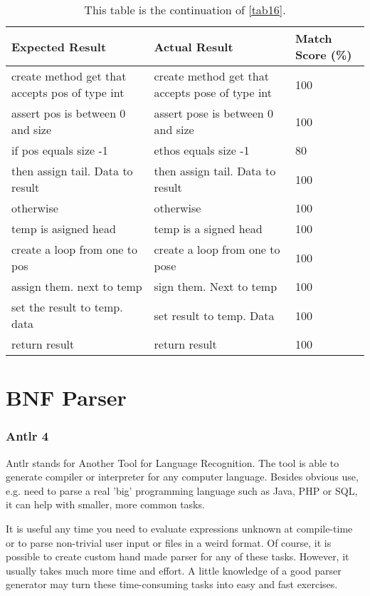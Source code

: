 \begin{table}[H]
	\centering
	\begin{tabular}{|p{6cm}|p{6cm}|p{2cm}|}
		\hline
		{\bf Expected Result} & {\bf Actual Result} & {\bf Match Score (\%)} \\ \hline
		create method get that accepts pos of type int & create method get that accepts pose of type int & 100 \\ \hline
		assert pos is between 0 and size & assert pose is between 0 and size & 100 \\ \hline
		if pos equals size -1 & ethos equals size -1 & 80 \\ \hline
		then assign tail. Data to result & then assign tail. Data to result & 100 \\ \hline
		otherwise & otherwise & 100 \\ \hline
		temp is asigned head & temp is a signed head & 100 \\ \hline
		create a loop from one to pos & create a loop from one to pose & 100 \\ \hline
		assign them. next to temp & sign them. Next to temp & 100 \\ \hline
		set the result to temp. data & set result to temp. Data & 100 \\ \hline
		return result & return result & 100 \\ \hline
	\end{tabular}
	\caption{This table is the continuation of \ref{tab16}.}
	\label{tab17}
\end{table} 
\section{BNF Parser} \label{section:BNF Parser}
\subsubsection{Antlr 4}
Antlr stands for Another Tool for Language Recognition. The tool is able to generate compiler or interpreter for any computer language. Besides obvious use, e.g. need to parse a real 'big' programming language such as Java, PHP or SQL, it can help with smaller, more common tasks.

It is useful any time you need to evaluate expressions unknown at compile-time or to parse non-trivial user input or files in a weird format. Of course, it is possible to create custom hand made parser for any of these tasks. However, it usually takes much more time and effort. A little knowledge of a good parser generator may turn these time-consuming tasks into easy and fast exercises.


